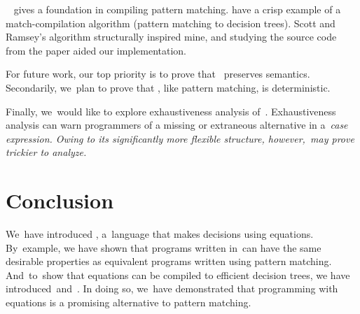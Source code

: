 \documentclass[article,screen,12pt, nonacm]{acmart}
\begin{document}
    \citet{augustsson1985compiling}~ gives a foundation in compiling pattern
    matching. \citet{scottramsey} have a crisp example of a match-compilation
    algorithm (pattern matching to decision trees). Scott and Ramsey's algorithm
    structurally inspired mine, and studying the source code from the paper
    aided our implementation. 

    For future work, our top priority is to prove that \DTran~preserves
    semantics. Secondarily, we~plan to prove that \VMinus, like pattern
    matching, is deterministic. 

    Finally, we~would like to explore
    exhaustiveness analysis of~\VMinus.
    Exhaustiveness analysis
    can warn programmers of a missing or extraneous alternative in a~\it{case} expression.
    Owing to its significantly more flexible structure,
    however,~\iffibf may prove trickier to analyze.
    
    
    
    
    
    
    
    
    
    
    
    
    
    
    
    
    
        
    


    
    
    

    
    
        







        

            
            
            





        
        
        

        

    \section{Conclusion}

    We~have introduced \VMinus, a~language that makes decisions using equations.
    By~example, we have shown that programs written in~\VMinus can have the same
    desirable properties as equivalent programs written using pattern matching.
    And~to~show that equations can be compiled to efficient decision trees, we
    have introduced~\D and~\DTran. In doing so, we~have demonstrated that
    programming with equations is a promising alternative to pattern matching.
    
    
\end{document}
